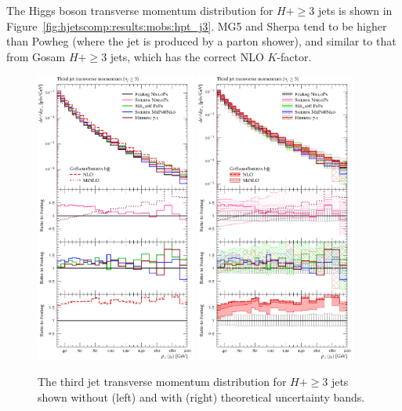 The Higgs boson transverse momentum distribution for $H+\ge3$ jets is
shown in Figure~\ref{fig:hjetscomp:results:mobs:hpt_j3}. MG5 and
Sherpa tend to be higher than Powheg (where the jet is produced by a
parton shower), and similar to that from Gosam $H+\ge3$ jets, which
has the correct NLO $K$-factor.

\begin{figure}[t!]
  \centering
  \includegraphics[width=0.47\textwidth]{figures/hjetscomp_u_jet3_pT_incl.pdf}
  \hfill
  \includegraphics[width=0.47\textwidth]{figures/hjetscomp_jet3_pT_incl.pdf}
  \caption{
    The third jet transverse momentum distribution for $H+\ge3$ jets
    shown without (left) and with (right) theoretical uncertainty bands.
    \label{fig:hjetscomp:results:mobs:j3pt}
  }
\end{figure}

